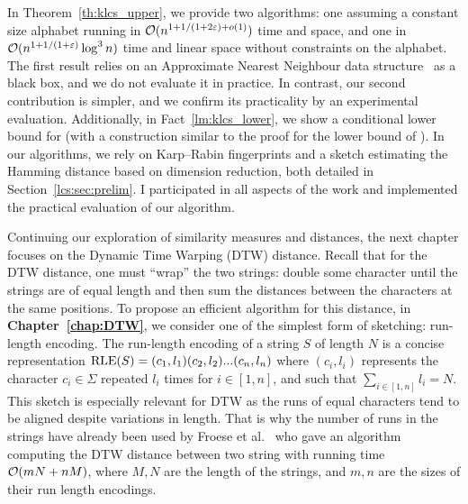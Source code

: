 In Theorem~\ref{th:klcs_upper}, we provide two algorithms: one assuming a constant size alphabet running in $\mathcal{O}(n^{1+ 1/(1+2\varepsilon) + o(1)})$ time and space, and one in $\mathcal{O}(n^{1+1/(1+\varepsilon)} \log^3 n)$ time and linear space without constraints on the alphabet. The first result relies on an Approximate Nearest Neighbour data structure~\cite{DBLP:conf/stoc/AndoniR15} as a black box, and we do not evaluate it in practice. In contrast, our second contribution is simpler, and we confirm its practicality by an experimental evaluation.
Additionally, in Fact~\ref{lm:klcs_lower}, we show a conditional lower bound for \kApproxLCS (with a construction similar to the proof for the lower bound of \kLCS ).
In our algorithms, we rely on Karp--Rabin fingerprints and a sketch estimating the Hamming distance based on dimension reduction, both detailed in Section~\ref{lcs:sec:prelim}.
I participated in all aspects of the work and implemented the practical evaluation of our algorithm.


Continuing our exploration of similarity measures and distances, the next chapter focuses on the Dynamic Time Warping (DTW) distance. Recall that for the DTW distance, one must ``wrap'' the two strings: double some character until the strings are of equal length and then sum the distances between the characters at the same positions.
To propose an efficient algorithm for this distance, in \textbf{Chapter~\ref{chap:DTW}}, we consider one of the simplest form of sketching: run-length encoding. The run-length encoding of a string $S$ of length $N$ is a concise representation $\mathrm{RLE}(S)=(c_1,l_1)(c_2,l_2)...(c_n,l_n)$ where $(c_i,l_i)$ represents the character $c_i \in \Sigma$ repeated $l_i$ times  for $i \in [1,n]$, and such that $\sum_{i\in [1,n]} l_i = N$.
This sketch is especially relevant for DTW as the runs of equal characters tend to be aligned despite variations in length. That is why the number of runs in the strings have already been used by Froese et al.~\cite{DBLP:journals/corr/abs-1903-03003} who gave an algorithm computing the DTW distance between two string with running time $\mathcal{O}(mN+nM)$, where $M,N$ are the length of the strings, and $m, n$ are the sizes of their run length encodings.

